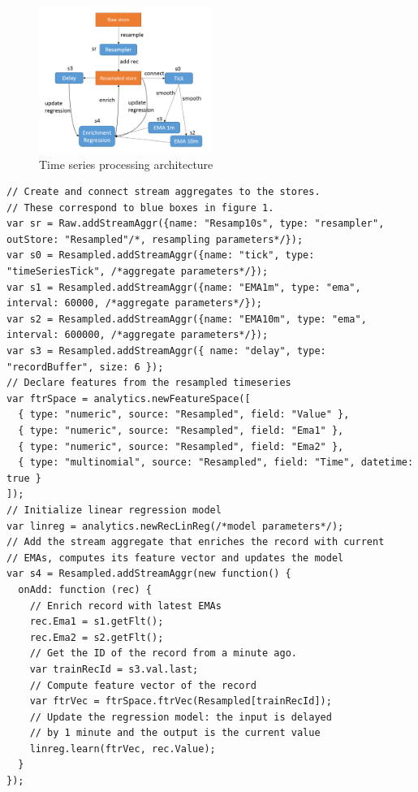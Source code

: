 \documentclass{article} %
\begin{document}
\begin{figure}[h]
\begin{center}
\includegraphics[width=0.5\textwidth]{timeSeries2.PNG}
\end{center}
\caption{Time series processing architecture}\label{fig:timeSeries}
\end{figure}

\begin{lstlisting}[caption=Time series processing] 	
// Create and connect stream aggregates to the stores. 
// These correspond to blue boxes in figure 1.
var sr = Raw.addStreamAggr({name: "Resamp10s", type: "resampler", outStore: "Resampled"/*, resampling parameters*/});
var s0 = Resampled.addStreamAggr({name: "tick", type: "timeSeriesTick", /*aggregate parameters*/});
var s1 = Resampled.addStreamAggr({name: "EMA1m", type: "ema", interval: 60000, /*aggregate parameters*/});
var s2 = Resampled.addStreamAggr({name: "EMA10m", type: "ema", interval: 600000, /*aggregate parameters*/});
var s3 = Resampled.addStreamAggr({ name: "delay", type: "recordBuffer", size: 6 });
// Declare features from the resampled timeseries
var ftrSpace = analytics.newFeatureSpace([
  { type: "numeric", source: "Resampled", field: "Value" },
  { type: "numeric", source: "Resampled", field: "Ema1" },
  { type: "numeric", source: "Resampled", field: "Ema2" },
  { type: "multinomial", source: "Resampled", field: "Time", datetime: true }
]);
// Initialize linear regression model
var linreg = analytics.newRecLinReg(/*model parameters*/);
// Add the stream aggregate that enriches the record with current
// EMAs, computes its feature vector and updates the model
var s4 = Resampled.addStreamAggr(new function() {
  onAdd: function (rec) {
    // Enrich record with latest EMAs
    rec.Ema1 = s1.getFlt();
    rec.Ema2 = s2.getFlt();
    // Get the ID of the record from a minute ago.
    var trainRecId = s3.val.last;
    // Compute feature vector of the record
    var ftrVec = ftrSpace.ftrVec(Resampled[trainRecId]);
    // Update the regression model: the input is delayed 
    // by 1 minute and the output is the current value
    linreg.learn(ftrVec, rec.Value);
  }
});
\end{lstlisting}
\end{document}

